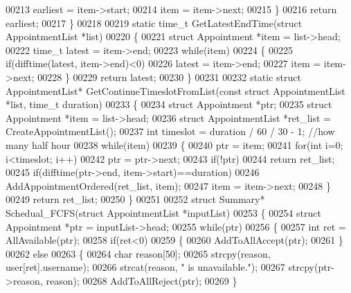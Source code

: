 \begin{DoxyCode}
00213             earliest = item->start;
00214         item = item->next;
00215     \}
00216     \textcolor{keywordflow}{return} earliest;
00217 \}
00218 
00219 \textcolor{keyword}{static} time\_t GetLatestEndTime(\textcolor{keyword}{struct} AppointmentList *list)
00220 \{
00221     \textcolor{keyword}{struct }Appointment *item = list->head;
00222     time\_t latest = item->end;
00223     \textcolor{keywordflow}{while}(item)
00224     \{
00225         \textcolor{keywordflow}{if}(difftime(latest, item->end)<0)
00226             latest = item->end;
00227         item = item->next;
00228     \}
00229     \textcolor{keywordflow}{return} latest;
00230 \}
00231 
00232 \textcolor{keyword}{static} \textcolor{keyword}{struct }AppointmentList* GetContinueTimeslotFromList(\textcolor{keyword}{const} \textcolor{keyword}{struct} 
      AppointmentList *list, time\_t duration)
00233 \{
00234     \textcolor{keyword}{struct }Appointment *ptr;
00235     \textcolor{keyword}{struct }Appointment *item = list->head;
00236     \textcolor{keyword}{struct }AppointmentList *ret\_list = CreateAppointmentList();
00237     \textcolor{keywordtype}{int} timeslot = duration / 60 / 30 - 1;  \textcolor{comment}{//how many half hour}
00238     \textcolor{keywordflow}{while}(item)
00239     \{
00240         ptr = item;
00241         \textcolor{keywordflow}{for}(\textcolor{keywordtype}{int} i=0; i<timeslot; i++)
00242             ptr = ptr->next;
00243         \textcolor{keywordflow}{if}(!ptr)
00244             \textcolor{keywordflow}{return} ret\_list;
00245         \textcolor{keywordflow}{if}(difftime(ptr->end, item->start)==duration)
00246             AddAppointmentOrdered(ret\_list, item);
00247         item = item->next;
00248     \}
00249     \textcolor{keywordflow}{return} ret\_list;
00250 \}
00251 
00252 \textcolor{keyword}{struct }Summary* Schedual_FCFS(\textcolor{keyword}{struct} AppointmentList *inputList)
00253 \{
00254     \textcolor{keyword}{struct }Appointment *ptr = inputList->head;
00255     \textcolor{keywordflow}{while}(ptr)
00256     \{
00257         \textcolor{keywordtype}{int} ret = AllAvailable(ptr);
00258         \textcolor{keywordflow}{if}(ret<0)
00259         \{
00260             AddToAllAccept(ptr);
00261         \}
00262         \textcolor{keywordflow}{else}
00263         \{
00264             \textcolor{keywordtype}{char} reason[50];
00265             strcpy(reason, user[ret].username);
00266             strcat(reason, \textcolor{stringliteral}{" is unavailable."});
00267             strcpy(ptr->reason, reason);
00268             AddToAllReject(ptr);
00269         \}

\end{DoxyCode}

